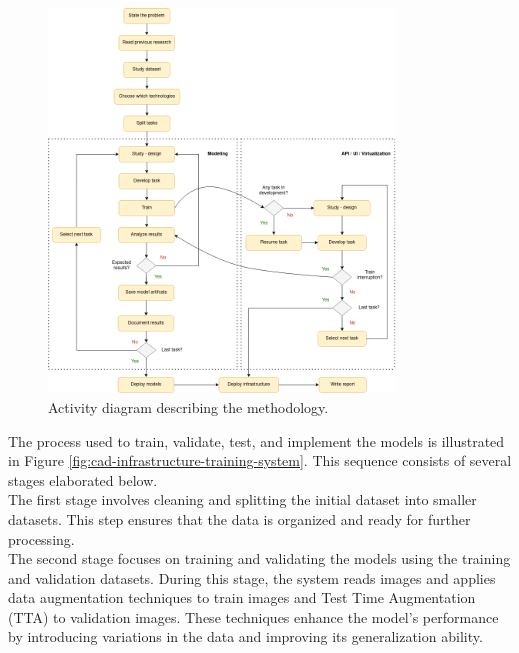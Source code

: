\newpage

\begin{landscape}

  \begin{figure}[H]
  \centering
  \includegraphics[width=0.82\textwidth]{imatges/planing_and_methodology/EmplyedMethodology.png}
  \caption{Activity diagram describing the methodology.}
  \label{fig:flux_development}
  \end{figure}

\end{landscape}


The process used to train, validate, test, and implement the models is
illustrated in Figure \ref{fig:cad-infrastructure-training-system}. This
sequence consists of several stages elaborated below. \\

The first stage involves cleaning and splitting the initial dataset into
smaller datasets. This step ensures that the data is organized and ready for
further processing. \\

The second stage focuses on training and validating the models using the
training and validation datasets. During this stage, the system reads images
and applies data augmentation techniques to train images and Test Time
Augmentation (TTA) to validation images. These techniques enhance the model's
performance by introducing variations in the data and improving its
generalization ability. \\

